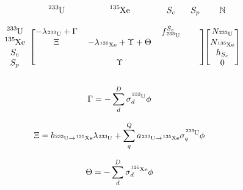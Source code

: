     \begin{equation}
    \label{fig:burn_matrix}
        \begin{blockarray}{cccccc}
             &
            \ce{^{233}U} &
            \ce{^{135}Xe} &
            S_{c} &
            S_{p} &
            \mathbb{N} \\
             &
             &
             &
             &
             &
             \\ 
        \begin{block}{c[cccc][c]}
            \ce{^{233}U} &
            -\lambda_{\ce{^{233}U}} + \Gamma &
             &
            f^{S_{c}}_{\ce{^{233}U}} &
             &
            N_{\ce{^{233}U}} \\
            \ce{^{135}Xe} &
            \Xi &
            -\lambda_{\ce{^{135}Xe}} + \Upsilon + \Theta &
             &
             &
            N_{\ce{^{135}Xe}} \\
            S_{c} &
             &
             &
             &
             &
            h_{S_{c}} \\
            S_{p} &
             &
             \Upsilon &
             &
             &
             0\\
        \end{block}
        \end{blockarray}
    \end{equation}

\begin{equation}
\label{eq:Gamma_def}
\Gamma = - \sum \limits_{d}^{D} \sigma_{d}^{\ce{^{233}U}} \phi
\end{equation}

\begin{equation}
\label{eq:Xi_def}
\Xi = b_{\ce{^{233}U} \rightarrow \ce{^{135}Xe}} \lambda_{\ce{^{233}U}} + \sum
\limits_{q}^{Q} a_{\ce{^{233}U} \rightarrow \ce{^{135}Xe}} \sigma_{q}^{
\ce{^{233}U}} \phi
\end{equation}

\begin{equation}
\label{eq:Theta_def}
\Theta =-\sum \limits_{d}^{D} \sigma_{d}^{\ce{^{135}Xe}} \phi
\end{equation}


